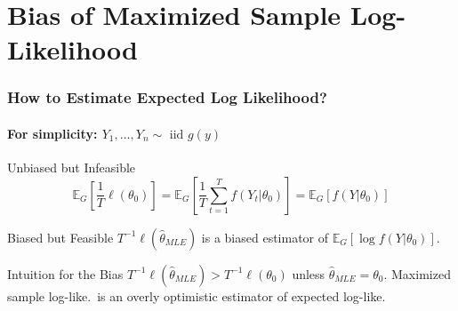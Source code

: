 \section{Bias of Maximized Sample Log-Likelihood} 
\begin{frame}
  \frametitle{How to Estimate Expected Log Likelihood?}
  \framesubtitle{For simplicity: $Y_1, \dots, Y_n \sim \mbox{ iid } g(y)$}


  \begin{block}{Unbiased but Infeasible}
    \[
      \mathbb{E}_G \left[\frac{1}{T}\ell(\theta_0)\right] = \mathbb{E}_G\left[ \frac{1}{T} \sum_{t=1}^T f(Y_t|\theta_0)\right] = \mathbb{E}_G\left[ f(Y|\theta_0) \right]
    \]
    
  \end{block}
   
  \pause

  \vspace{-1em}

  \begin{block}{Biased but Feasible}
    $T^{-1}\ell(\widehat{\theta}_{MLE})$ is a \alert{biased} estimator of $\mathbb{E}_G[\log f(Y|\theta_0)]$. 
  \end{block}

  \pause

  \begin{block}{Intuition for the Bias}
    $T^{-1}\ell(\widehat{\theta}_{MLE}) > T^{-1}\ell(\theta_0)$ unless $\widehat{\theta}_{MLE} = \theta_0$. 
    Maximized sample log-like.\ is an \alert{overly optimistic} estimator of expected log-like.
  \end{block}

\end{frame}

